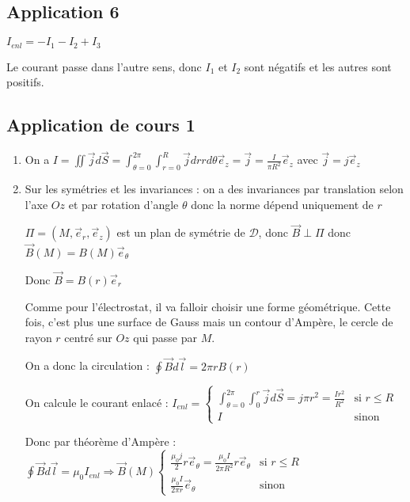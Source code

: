\documentclass[a4paper,12pt]{book}
\begin{document}
\subsection{Application 6}
$I_{enl} = -I_1-I_2+I_3$
\par Le courant passe dans l'autre sens, donc $I_1$ et $I_2$ sont négatifs et les autres sont positifs.

\subsection{Application de cours 1}
\begin{enumerate}
\item On a $I=\iint\vec{j}d\vec{S}=\int_{\theta=0}^{2\pi}\int_{r=0}^R\vec{j} drrd\theta\vec{e}_z=\vec{j} = \frac{I}{\pi R^2}\vec{e}_z$ avec $\vec{j}=j\vec{e}_z$
\item Sur les symétries et les invariances : on a des invariances par translation selon l'axe $Oz$ et par rotation d'angle $\theta$ donc la norme dépend uniquement de $r$
\par $\Pi=(M,\vec{e}_r,\vec{e}_z)$ est un plan de symétrie de $\mathcal{D}$, donc $\vec{B}\perp\Pi$ donc $\vec{B}(M)=B(M)\vec{e}_\theta$
\par Donc $\vec{B}=B(r)\vec{e}_r$
\par Comme pour l'électrostat, il va falloir choisir une forme géométrique. Cette fois, c'est plus une surface de Gauss mais un contour d'Ampère, le cercle de rayon $r$ centré sur $Oz$ qui passe par $M$.
\par On a donc la circulation : $\oint\vec{B}d\vec{l}=2\pi rB(r)$
\par On calcule le courant enlacé : $I_{enl}=\left\{\begin{array}{rl} \int_{\theta=0}^{2\pi}\int_{0}^r\vec{j}d\vec{S}=j\pi r^2=\frac{Ir^2}{R^2} & \text{si $r\leq R$} \\ I & \text{sinon} \end{array}\right.$
\par Donc par théorème d'Ampère : $\oint\vec{B}d\vec{l}=\mu_0I_{enl} \Rightarrow \vec{B}(M) \left\{\begin{array}{rl} \frac{\mu_0j}{2}r\vec{e}_\theta=\frac{\mu_0I}{2\pi R^2}r\vec{e}_\theta & \text{si $r\leq R$} \\ \frac{\mu_0I}{2\pi r}\vec{e}_\theta & \text{sinon} \end{array}\right.$
\end{enumerate}
\end{document}
